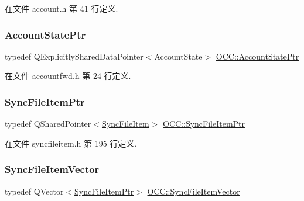 在文件 account.\+h 第 41 行定义.

\mbox{\label{namespace_o_c_c_a6d63fdb73f2bf88258aee6a5e9a0b1f5}} 
\subsubsection{\texorpdfstring{Account\+State\+Ptr}{AccountStatePtr}}
{\footnotesize\ttfamily typedef Q\+Explicitly\+Shared\+Data\+Pointer$<$Account\+State$>$ \hyperlink{namespace_o_c_c_a6d63fdb73f2bf88258aee6a5e9a0b1f5}{O\+C\+C\+::\+Account\+State\+Ptr}}



在文件 accountfwd.\+h 第 24 行定义.

\mbox{\label{namespace_o_c_c_acb6b0db82893659fbd0c98d3c5b8e2b8}} 
\subsubsection{\texorpdfstring{Sync\+File\+Item\+Ptr}{SyncFileItemPtr}}
{\footnotesize\ttfamily typedef Q\+Shared\+Pointer$<$\hyperlink{class_o_c_c_1_1_sync_file_item}{Sync\+File\+Item}$>$ \hyperlink{namespace_o_c_c_acb6b0db82893659fbd0c98d3c5b8e2b8}{O\+C\+C\+::\+Sync\+File\+Item\+Ptr}}



在文件 syncfileitem.\+h 第 195 行定义.

\mbox{\label{namespace_o_c_c_af407f0fdf0476e0bfce478be3d0e441e}} 
\subsubsection{\texorpdfstring{Sync\+File\+Item\+Vector}{SyncFileItemVector}}
{\footnotesize\ttfamily typedef Q\+Vector$<$\hyperlink{namespace_o_c_c_acb6b0db82893659fbd0c98d3c5b8e2b8}{Sync\+File\+Item\+Ptr}$>$ \hyperlink{namespace_o_c_c_af407f0fdf0476e0bfce478be3d0e441e}{O\+C\+C\+::\+Sync\+File\+Item\+Vector}}



